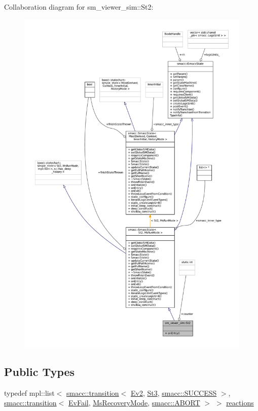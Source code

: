 Collaboration diagram for sm\+\_\+viewer\+\_\+sim\+:\+:St2\+:
\nopagebreak
\begin{figure}[H]
\begin{center}
\leavevmode
\includegraphics[width=350pt]{structsm__viewer__sim_1_1St2__coll__graph}
\end{center}
\end{figure}
\subsection*{Public Types}
\begin{DoxyCompactItemize}
\item 
typedef mpl\+::list$<$ \hyperlink{classsmacc_1_1transition}{smacc\+::transition}$<$ \hyperlink{structsm__viewer__sim_1_1Ev2}{Ev2}, \hyperlink{structsm__viewer__sim_1_1St3}{St3}, \hyperlink{structsmacc_1_1SUCCESS}{smacc\+::\+S\+U\+C\+C\+E\+SS} $>$, \hyperlink{classsmacc_1_1transition}{smacc\+::transition}$<$ \hyperlink{structsm__viewer__sim_1_1EvFail}{Ev\+Fail}, \hyperlink{structsm__viewer__sim_1_1MsRecoveryMode}{Ms\+Recovery\+Mode}, \hyperlink{structsmacc_1_1ABORT}{smacc\+::\+A\+B\+O\+RT} $>$ $>$ \hyperlink{structsm__viewer__sim_1_1St2_adef5108438c9d8891229f9d247bd5995}{reactions}
\end{DoxyCompactItemize}
